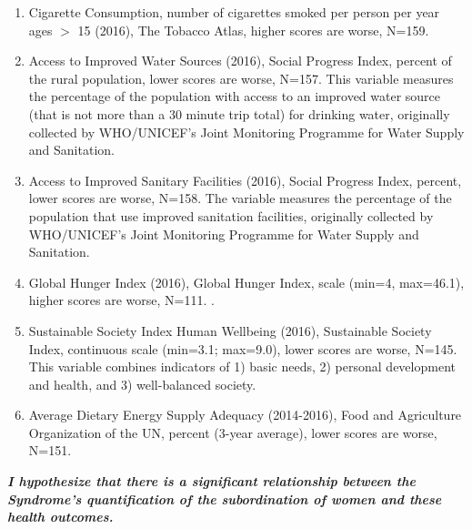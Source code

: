 \begin{enumerate}
\item Cigarette Consumption, number of cigarettes smoked per person per year ages $>$ 15 (2016), The Tobacco Atlas, higher scores are worse, N=159. 
\item Access to Improved Water Sources (2016), Social Progress Index, percent of the rural population, lower scores are worse, N=157. This variable measures the percentage of the population with access to an improved water source (that is not more than a 30 minute trip total) for drinking water, originally collected by WHO/UNICEF's Joint Monitoring Programme for Water Supply and Sanitation.
\item Access to Improved Sanitary Facilities (2016), Social Progress Index, percent, lower scores are worse, N=158. The variable measures the percentage of the population that use improved sanitation facilities, originally collected by WHO/UNICEF's Joint Monitoring Programme for Water Supply and Sanitation.
\item Global Hunger Index (2016), Global Hunger Index, scale (min=4, max=46.1), higher scores are worse, N=111. \cite{ghi}.
\item Sustainable Society Index Human Wellbeing (2016), Sustainable Society Index, continuous scale (min=3.1; max=9.0), lower scores are worse, N=145. This variable combines indicators of 1) basic needs, 2) personal development and health, and 3) well-balanced society. 
\item Average Dietary Energy Supply Adequacy (2014-2016), Food and Agriculture Organization of the UN, percent (3-year average), lower scores are worse, N=151. 
\end{enumerate}

\textbf{\textit{I hypothesize that there is a significant relationship between the Syndrome's quantification of the subordination of women and these health outcomes.}}









